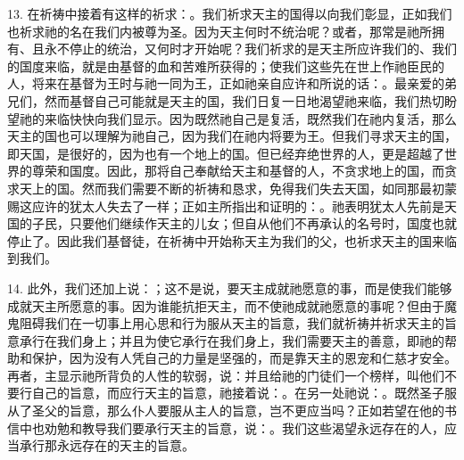 13. 在祈祷中接着有这样的祈求：。我们祈求天主的国得以向我们彰显，正如我们也祈求祂的名在我们内被尊为圣。因为天主何时不统治呢？或者，那常是祂所拥有、且永不停止的统治，又何时才开始呢？我们祈求的是天主所应许我们的、我们的国度来临，就是由基督的血和苦难所获得的；使我们这些先在世上作祂臣民的人，将来在基督为王时与祂一同为王，正如祂亲自应许和所说的话：。最亲爱的弟兄们，然而基督自己可能就是天主的国，我们日复一日地渴望祂来临，我们热切盼望祂的来临快快向我们显示。因为既然祂自己是复活，既然我们在祂内复活，那么天主的国也可以理解为祂自己，因为我们在祂内将要为王。但我们寻求天主的国，即天国，是很好的，因为也有一个地上的国。但已经弃绝世界的人，更是超越了世界的尊荣和国度。因此，那将自己奉献给天主和基督的人，不贪求地上的国，而贪求天上的国。然而我们需要不断的祈祷和恳求，免得我们失去天国，如同那最初蒙赐这应许的犹太人失去了一样；正如主所指出和证明的：。祂表明犹太人先前是天国的子民，只要他们继续作天主的儿女；但自从他们不再承认的名号时，国度也就停止了。因此我们基督徒，在祈祷中开始称天主为我们的父，也祈求天主的国来临到我们。\par

14. 此外，我们还加上说：；这不是说，要天主成就祂愿意的事，而是使我们能够成就天主所愿意的事。因为谁能抗拒天主，而不使祂成就祂愿意的事呢？但由于魔鬼阻碍我们在一切事上用心思和行为服从天主的旨意，我们就祈祷并祈求天主的旨意承行在我们身上；并且为使它承行在我们身上，我们需要天主的善意，即祂的帮助和保护，因为没有人凭自己的力量是坚强的，而是靠天主的恩宠和仁慈才安全。再者，主显示祂所背负的人性的软弱，说：并且给祂的门徒们一个榜样，叫他们不要行自己的旨意，而应行天主的旨意，祂接着说：。在另一处祂说：。既然圣子服从了圣父的旨意，那么仆人要服从主人的旨意，岂不更应当吗？正如若望在他的书信中也劝勉和教导我们要承行天主的旨意，说：。我们这些渴望永远存在的人，应当承行那永远存在的天主的旨意。\par

